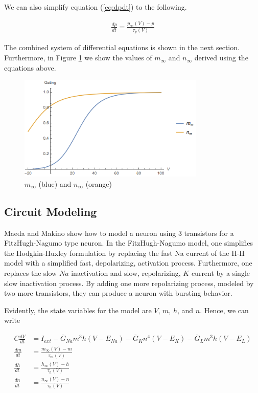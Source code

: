 \documentclass[12]{amsbook}
\newcommand\0{\mathbf{0}}
\newcommand\<{\langle}
\renewcommand\>{\rangle}
\begin{document}
We can also simplify equation (\ref{eq:dpdt}) to the following.

\begin{align*}
    \frac{dp}{dt} = \frac{p_{\infty}(V)-p}{\tau_p(V)}
\end{align*}

The combined system of differential equations is shown in the next section. Furthermore, in Figure \ref{fig:inf} we show the values of $m_\infty$ and $n_\infty$ derived using the equations above. 

\begin{figure}
\centering
	\includegraphics[height=5cm]{gating.png}
	\caption{$m_{\infty}$ (blue) and $n_{\infty}$ (orange)}
		\label{fig:inf}
\end{figure}

\subsection{Circuit Modeling} 

Maeda and Makino \cite{maeda2000pulse} show how to model a neuron using 3 transistors for a FitzHugh-Nagumo type neuron. In the FitzHugh-Nagumo model, one simplifies the Hodgkin-Huxley formulation by replacing the fast Na current of the H-H model with a simplified fast, depolarizing, activation process. Furthermore, one replaces the slow $Na$ inactivation and slow, repolarizing, $K$ current by a single slow inactivation process. By adding one more repolarizing process, modeled by two more transistors, they can produce a neuron with bursting behavior. 

Evidently, the state variables for the model are $V$, $m$, $h$, and $n$. Hence, we can write

\begin{align*}
    C\frac{dV}{dt} &= I_{ext} -\bar{G}_{Na}m^3h(V-E_{Na}) -\bar{G}_{K}n^4(V-E_{K})  -\bar{G}_{L}m^3h(V-E_{L}) \\
    \frac{dm}{dt} &= \frac{m_{\infty}(V)-m}{\tau_m(V)} \\
    \frac{dh}{dt} &= \frac{h_{\infty}(V)-h}{\tau_h(V)} \\
    \frac{dn}{dt} &= \frac{n_{\infty}(V)-n}{\tau_n(V)} 
\end{align*}
\end{document}
